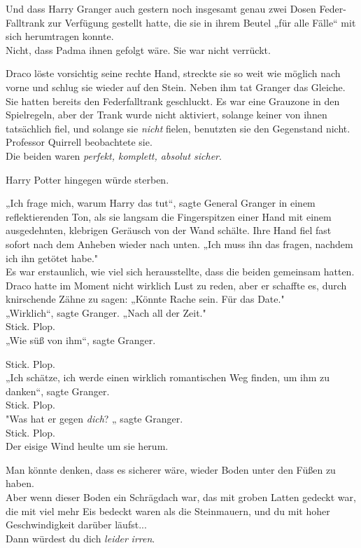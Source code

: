 {Und dass Harry Granger auch gestern noch insgesamt genau zwei Dosen Feder-Falltrank zur Verfügung gestellt hatte, die sie in ihrem Beutel „für alle Fälle“ mit sich herumtragen konnte.\\ Nicht, dass Padma ihnen gefolgt wäre. Sie war nicht verrückt.

Draco löste vorsichtig seine rechte Hand, streckte sie so weit wie möglich nach vorne und schlug sie wieder auf den Stein. Neben ihm tat Granger das Gleiche.\\ Sie hatten bereits den Federfalltrank geschluckt. Es war eine Grauzone in den Spielregeln, aber der Trank wurde nicht aktiviert, solange keiner von ihnen tatsächlich fiel, und solange sie \emph{nicht} fielen, benutzten sie den Gegenstand nicht.\\ Professor Quirrell beobachtete sie.\\ Die beiden waren \emph{perfekt, komplett, absolut sicher}.

Harry Potter hingegen würde sterben.

„Ich frage mich, warum Harry das tut“, sagte General Granger in einem reflektierenden Ton, als sie langsam die Fingerspitzen einer Hand mit einem ausgedehnten, klebrigen Geräusch von der Wand schälte. Ihre Hand fiel fast sofort nach dem Anheben wieder nach unten. „Ich muss ihn das fragen, nachdem ich ihn getötet habe."\\ Es war erstaunlich, wie viel sich herausstellte, dass die beiden gemeinsam hatten.\\ Draco hatte im Moment nicht wirklich Lust zu reden, aber er schaffte es, durch knirschende Zähne zu sagen: „Könnte Rache sein. Für das Date."\\ „Wirklich“, sagte Granger. „Nach all der Zeit."\\ Stick. Plop.\\ „Wie süß von ihm“, sagte Granger.

Stick. Plop.\\ „Ich schätze, ich werde einen wirklich romantischen Weg finden, um ihm zu danken“, sagte Granger.\\ Stick. Plop.\\ "Was hat er gegen \emph{dich}? „ sagte Granger.\\ Stick. Plop.\\ Der eisige Wind heulte um sie herum.

Man könnte denken, dass es sicherer wäre, wieder Boden unter den Füßen zu haben.\\ Aber wenn dieser Boden ein Schrägdach war, das mit groben Latten gedeckt war, die mit viel mehr Eis bedeckt waren als die Steinmauern, und du mit hoher Geschwindigkeit darüber läufst...\\ Dann würdest du dich \emph{leider} \emph{irren}.

}

